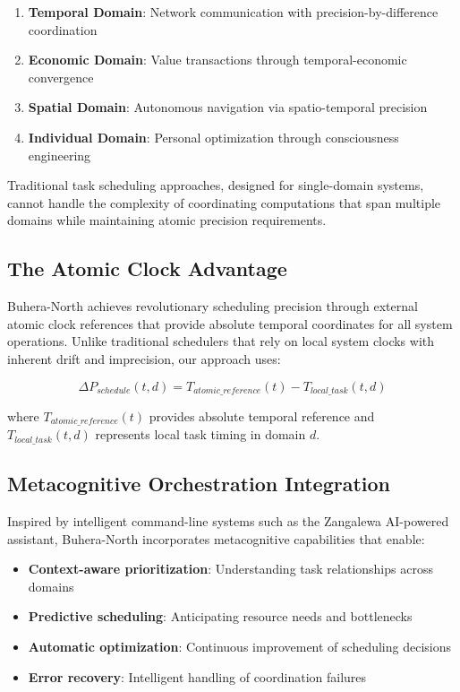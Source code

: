 \documentclass[12pt,a4paper]{article}
\begin{document}
\begin{enumerate}
\item \textbf{Temporal Domain}: Network communication with precision-by-difference coordination
\item \textbf{Economic Domain}: Value transactions through temporal-economic convergence
\item \textbf{Spatial Domain}: Autonomous navigation via spatio-temporal precision
\item \textbf{Individual Domain}: Personal optimization through consciousness engineering
\end{enumerate}

Traditional task scheduling approaches, designed for single-domain systems, cannot handle the complexity of coordinating computations that span multiple domains while maintaining atomic precision requirements.

\subsection{The Atomic Clock Advantage}

Buhera-North achieves revolutionary scheduling precision through external atomic clock references that provide absolute temporal coordinates for all system operations. Unlike traditional schedulers that rely on local system clocks with inherent drift and imprecision, our approach uses:

\begin{equation}
\Delta P_{schedule}(t,d) = T_{atomic\_reference}(t) - T_{local\_task}(t,d)
\end{equation}

where $T_{atomic\_reference}(t)$ provides absolute temporal reference and $T_{local\_task}(t,d)$ represents local task timing in domain $d$.

\subsection{Metacognitive Orchestration Integration}

Inspired by intelligent command-line systems such as the Zangalewa AI-powered assistant, Buhera-North incorporates metacognitive capabilities that enable:

\begin{itemize}
\item \textbf{Context-aware prioritization}: Understanding task relationships across domains
\item \textbf{Predictive scheduling}: Anticipating resource needs and bottlenecks
\item \textbf{Automatic optimization}: Continuous improvement of scheduling decisions
\item \textbf{Error recovery}: Intelligent handling of coordination failures
\end{itemize}
\end{document}
